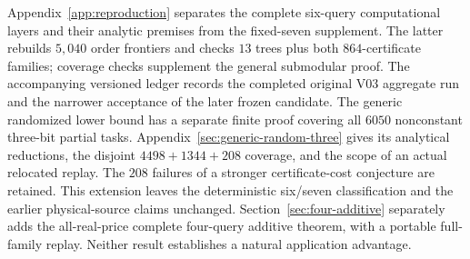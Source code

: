 \documentclass[pdflatex,sn-mathphys-num]{sn-jnl}
\theoremstyle{thmstyleone}
\theoremstyle{thmstylethree}
\theoremstyle{thmstyletwo}
\begin{document}
Appendix~\ref{app:reproduction} separates the complete six-query computational layers and their analytic premises from the fixed-seven supplement. The latter rebuilds $5,040$ order frontiers and checks $13$ trees plus both $864$-certificate families; coverage checks supplement the general submodular proof. The accompanying versioned ledger records the completed original V03 aggregate run and the narrower acceptance of the later frozen candidate.
The generic randomized lower bound has a separate finite proof covering all $6050$ nonconstant three-bit partial tasks. Appendix~\ref{sec:generic-random-three} gives its analytical reductions, the disjoint $4498+1344+208$ coverage, and the scope of an actual relocated replay. The $208$ failures of a stronger certificate-cost conjecture are retained. This extension leaves the deterministic six/seven classification and the earlier physical-source claims unchanged. Section~\ref{sec:four-additive} separately adds the all-real-price complete four-query additive theorem, with a portable full-family replay. Neither result establishes a natural application advantage.
\end{document}
